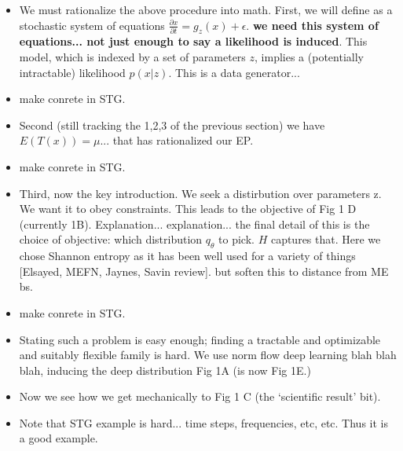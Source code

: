 \documentclass[11pt]{article}
\begin{document}
\begin{itemize}
\item We must rationalize the above procedure into math.  First, we will define as a stochastic system of equations $\frac{\partial x}{\partial t} = g_z(x) + \epsilon$.  {\bf we need this system of equations... not just enough to say a likelihood is induced}.   This model, which is indexed by a set of parameters $z$, implies a (potentially intractable) likelihood $p(x|z)$.   This is a data generator...  
\item make conrete in STG.
\item Second (still tracking the 1,2,3 of the previous section) we have $E(T(x)) = \mu$... that has rationalized our EP.
\item make conrete in STG.
\item Third, now the key introduction.  We seek a distirbution over parameters z.  We want it to obey constraints.   This leads to the objective of Fig 1 D (currently 1B).   Explanation... explanation... the final detail of this is the choice of objective: which distribution $q_\theta$ to pick.  $H$ captures that.  Here we chose Shannon entropy as it has been well used for a variety of things [Elsayed, MEFN, Jaynes, Savin review]. but soften this to distance from ME bs.
\item make conrete in STG.
\item Stating such a problem is easy enough; finding a tractable and optimizable and suitably flexible family is hard.  We use norm flow deep learning blah blah blah, inducing the deep distribution Fig 1A  (is now Fig 1E.)
\item Now we see how we get mechanically to Fig 1 C (the `scientific result' bit).
\item Note that STG example is hard... time steps, frequencies, etc, etc.  Thus it is a good example.
\end{itemize}
\end{document}
